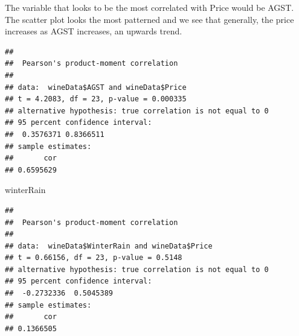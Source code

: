 \documentclass[
]{article}
\newenvironment{Shaded}{\begin{snugshade}}{\end{snugshade}}
\newcommand{\DataTypeTok}[1]{\textcolor[rgb]{0.13,0.29,0.53}{#1}}
\newcommand{\KeywordTok}[1]{\textcolor[rgb]{0.13,0.29,0.53}{\textbf{#1}}}
\newcommand{\NormalTok}[1]{#1}
\newcommand{\OperatorTok}[1]{\textcolor[rgb]{0.81,0.36,0.00}{\textbf{#1}}}
\newcommand{\StringTok}[1]{\textcolor[rgb]{0.31,0.60,0.02}{#1}}
\begin{document}
The variable that looks to be the most correlated with Price would be
AGST. The scatter plot looks the most patterned and we see that
generally, the price increases as AGST increases, an upwards trend.

\begin{Shaded}
\end{Shaded}

\begin{verbatim}
## 
##  Pearson's product-moment correlation
## 
## data:  wineData$AGST and wineData$Price
## t = 4.2083, df = 23, p-value = 0.000335
## alternative hypothesis: true correlation is not equal to 0
## 95 percent confidence interval:
##  0.3576371 0.8366511
## sample estimates:
##       cor 
## 0.6595629
\end{verbatim}

\begin{Shaded}
\begin{Highlighting}[]
\NormalTok{winterRain}
\end{Highlighting}
\end{Shaded}

\begin{verbatim}
## 
##  Pearson's product-moment correlation
## 
## data:  wineData$WinterRain and wineData$Price
## t = 0.66156, df = 23, p-value = 0.5148
## alternative hypothesis: true correlation is not equal to 0
## 95 percent confidence interval:
##  -0.2732336  0.5045389
## sample estimates:
##       cor 
## 0.1366505
\end{verbatim}
\end{document}
